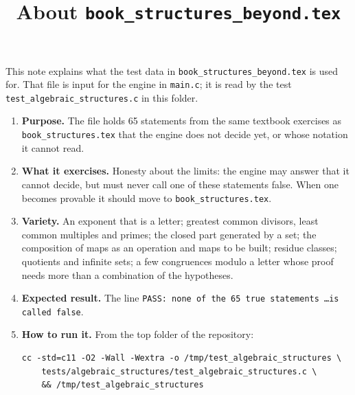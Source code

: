 \documentclass[11pt,a4paper]{article}
\title{About \texttt{book\_structures\_beyond.tex}}
\author{}
\date{}
\begin{document}
\maketitle
This note explains what the test data in \texttt{book\_structures\_beyond.tex} is used for. That file is input for the engine in \texttt{main.c}; it is read by the test \texttt{test\_algebraic\_structures.c} in this folder.

\begin{enumerate}
\item \textbf{Purpose.} The file holds 65 statements from the same textbook exercises as \texttt{book\_structures.tex} that the engine does not decide yet, or whose notation it cannot read.

\item \textbf{What it exercises.} Honesty about the limits: the engine may answer that it cannot decide, but must never call one of these statements false. When one becomes provable it should move to \texttt{book\_structures.tex}.

\item \textbf{Variety.} An exponent that is a letter; greatest common divisors, least common multiples and primes; the closed part generated by a set; the composition of maps as an operation and maps to be built; residue classes; quotients and infinite sets; a few congruences modulo a letter whose proof needs more than a combination of the hypotheses.

\item \textbf{Expected result.} The line \texttt{PASS: none of the 65 true statements \ldots is called false}.

\item \textbf{How to run it.} From the top folder of the repository:
\begin{verbatim}
cc -std=c11 -O2 -Wall -Wextra -o /tmp/test_algebraic_structures \
    tests/algebraic_structures/test_algebraic_structures.c \
    && /tmp/test_algebraic_structures
\end{verbatim}
\end{enumerate}
\end{document}
